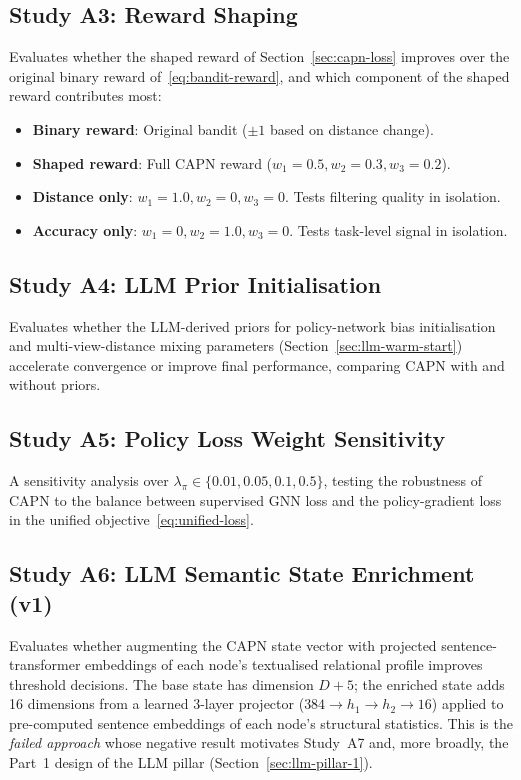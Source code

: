 \subsection{Study A3: Reward Shaping}

Evaluates whether the shaped reward of Section~\ref{sec:capn-loss} improves over the original binary reward of~\eqref{eq:bandit-reward}, and which component of the shaped reward contributes most:
\begin{itemize}
    \item \textbf{Binary reward}: Original bandit ($\pm 1$ based on distance change).
    \item \textbf{Shaped reward}: Full CAPN reward ($w_1 = 0.5, w_2 = 0.3, w_3 = 0.2$).
    \item \textbf{Distance only}: $w_1 = 1.0, w_2 = 0, w_3 = 0$. Tests filtering quality in isolation.
    \item \textbf{Accuracy only}: $w_1 = 0, w_2 = 1.0, w_3 = 0$. Tests task-level signal in isolation.
\end{itemize}

\subsection{Study A4: LLM Prior Initialisation}

Evaluates whether the LLM-derived priors for policy-network bias initialisation and multi-view-distance mixing parameters (Section~\ref{sec:llm-warm-start}) accelerate convergence or improve final performance, comparing CAPN with and without priors.

\subsection{Study A5: Policy Loss Weight Sensitivity}

A sensitivity analysis over $\lambda_\pi \in \{0.01, 0.05, 0.1, 0.5\}$, testing the robustness of CAPN to the balance between supervised GNN loss and the policy-gradient loss in the unified objective~\eqref{eq:unified-loss}.

\subsection{Study A6: LLM Semantic State Enrichment (v1)}
\label{sec:study-a6}

Evaluates whether augmenting the CAPN state vector with projected sentence-transformer embeddings of each node's textualised relational profile improves threshold decisions. The base state has dimension $D + 5$; the enriched state adds 16 dimensions from a learned 3-layer projector ($384 \to h_1 \to h_2 \to 16$) applied to pre-computed sentence embeddings of each node's structural statistics. This is the \emph{failed approach} whose negative result motivates Study~A7 and, more broadly, the Part~1 design of the LLM pillar (Section~\ref{sec:llm-pillar-1}).

